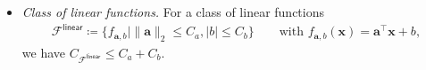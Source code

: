 \documentclass[english]{article}
\begin{document}
\begin{itemize}
%
	\item {\em Class of linear functions.} For a class of linear functions 
		\begin{align}
			\mathcal{F}^{\mathsf{linear}} \coloneqq
			\big\{ f_{\bm{a},b} \mid \|{\bm a}\|_2\le C_a,|b|\le C_b \big\}
			\qquad \text{with } f_{\bm{a},b}(\bm{x}) = {\bm a}^{\top}{\bm x} + b, 
		\end{align}
		we have $C_{\mathcal{F}^{\mathsf{linear}}}\le C_a + C_b$.



\end{itemize}
\end{document}
